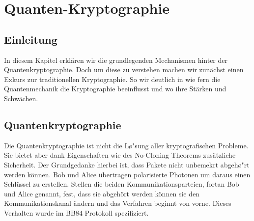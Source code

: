 \chapter{Quanten-Kryptographie\label{chapter:crypto}}
\begin{refsection}

\newpage
\section{Einleitung}
In diesem Kapitel erkl\"aren wir die grundlegenden Mechanismen hinter der Quantenkryptographie.
Doch um diese zu verstehen machen wir zun\"achst einen Exkurs zur traditionellen Kryptographie.
So wir deutlich in wie fern die Quantenmechanik die Kryptographie beeinflusst und wo ihre St\"arken und Schw\"achen.

\section{Quantenkryptographie}
Die Quantenkryptographie ist nicht die L\o"sung aller kryptografischen Probleme. Sie bietet aber dank Eigenschaften wie des No-Cloning Theorems zus\"atzliche Sicherheit.
Der Grundgedanke hierbei ist, dass Pakete nicht unbemekrt abgeh\o"rt werden k\"onnen. Bob und Alice \"ubertragen polarisierte Photonen um daraus einen Schl\"ussel zu erstellen. Stellen die beiden Kommunikationsparteien, fortan Bob und Alice genannt, fest, dass sie abgeh\"ort werden
k\"onnen sie den Kommunikationskanal \"andern und das Verfahren beginnt von vorne. Dieses Verhalten wurde im BB84 Protokoll spezifiziert.



\end{refsection}
